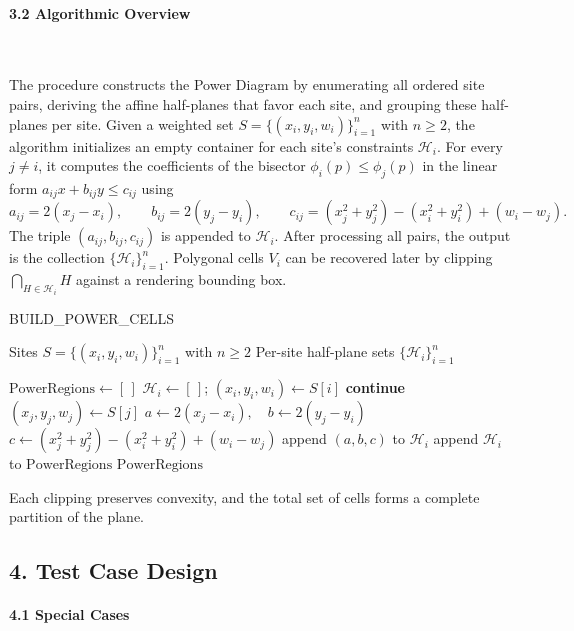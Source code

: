 \documentclass{article}
\begin{document}
\paragraph{3.2 Algorithmic Overview}\

The procedure constructs the Power Diagram by enumerating all ordered site pairs, deriving the affine half-planes that favor each site, and grouping these half-planes per site. Given a weighted set \(S=\{(x_i,y_i,w_i)\}_{i=1}^n\) with \(n\ge 2\), the algorithm initializes an empty container for each site’s constraints \(\mathcal H_i\). For every \(j\neq i\), it computes the coefficients of the bisector \(\phi_i(p)\le \phi_j(p)\) in the linear form \(a_{ij}x+b_{ij}y\le c_{ij}\) using
\[
a_{ij}=2(x_j-x_i),\qquad
b_{ij}=2(y_j-y_i),\qquad
c_{ij}=(x_j^2+y_j^2)-(x_i^2+y_i^2)+(w_i-w_j).
\]
The triple \((a_{ij},b_{ij},c_{ij})\) is appended to \(\mathcal H_i\). After processing all pairs, the output is the collection \(\{\mathcal H_i\}_{i=1}^n\). Polygonal cells \(V_i\) can be recovered later by clipping \(\bigcap_{H\in\mathcal H_i}H\) against a rendering bounding box. 
\begin{algorithm}[H]
\caption{BUILD\_POWER\_CELLS}
\begin{algorithmic}[1]
\Require Sites \(S=\{(x_i,y_i,w_i)\}_{i=1}^n\) with \(n\ge 2\)
\Ensure Per-site half-plane sets \(\{\mathcal H_i\}_{i=1}^n\)

\State \( \text{PowerRegions} \leftarrow [\,]\)
    \State \( \mathcal H_i \leftarrow [\,]\); \( (x_i,y_i,w_i) \leftarrow S[i]\)
         \State \textbf{continue} \EndIf
        \State \( (x_j,y_j,w_j) \leftarrow S[j]\)
        \State \( a \leftarrow 2(x_j-x_i),\quad b \leftarrow 2(y_j-y_i)\)
        \State \( c \leftarrow (x_j^2+y_j^2)-(x_i^2+y_i^2)+(w_i-w_j)\)
        \State append \((a,b,c)\) to \(\mathcal H_i\)
    \EndFor
    \State append \(\mathcal H_i\) to \(\text{PowerRegions}\)
\EndFor
\State \Return \(\text{PowerRegions}\)
\end{algorithmic}
\end{algorithm}

Each clipping preserves convexity, and the total set of cells forms a complete partition of the plane.

\subsection*{4. Test Case Design}

\paragraph{4.1 Special Cases}\
\end{document}
